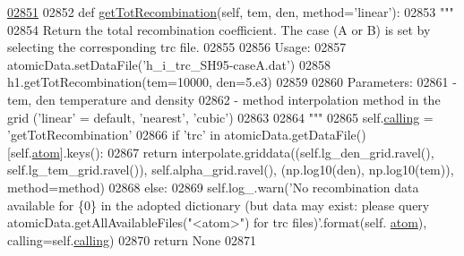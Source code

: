 \begin{DoxyCode}
\hypertarget{classpyneb_1_1core_1_1pynebcore_1_1_rec_atom_l02851}{}\hyperlink{classpyneb_1_1core_1_1pynebcore_1_1_rec_atom_ab7e0b11cdc85dade76528fe5de9886c0}{02851} 
02852     \textcolor{keyword}{def }\hyperlink{classpyneb_1_1core_1_1pynebcore_1_1_rec_atom_ab7e0b11cdc85dade76528fe5de9886c0}{getTotRecombination}(self, tem, den, method='linear'):
02853         \textcolor{stringliteral}{"""}
02854 \textcolor{stringliteral}{        Return the total recombination coefficient. The case (A or B) is set by selecting the corresponding
       trc file.}
02855 \textcolor{stringliteral}{        }
02856 \textcolor{stringliteral}{        Usage:}
02857 \textcolor{stringliteral}{            atomicData.setDataFile('h\_i\_trc\_SH95-caseA.dat')}
02858 \textcolor{stringliteral}{            h1.getTotRecombination(tem=10000, den=5.e3)}
02859 \textcolor{stringliteral}{            }
02860 \textcolor{stringliteral}{        Parameters:}
02861 \textcolor{stringliteral}{            - tem, den  temperature and density}
02862 \textcolor{stringliteral}{            - method    interpolation method in the grid ('linear' = default, 'nearest', 'cubic')    }
02863 \textcolor{stringliteral}{                }
02864 \textcolor{stringliteral}{        """} 
02865         self.\hyperlink{classpyneb_1_1core_1_1pynebcore_1_1_rec_atom_a82ec425ebba32b73a5d9ae52717d47c4}{calling} = \textcolor{stringliteral}{'getTotRecombination'}
02866         \textcolor{keywordflow}{if} \textcolor{stringliteral}{'trc'} \textcolor{keywordflow}{in} atomicData.getDataFile()[self.\hyperlink{classpyneb_1_1core_1_1pynebcore_1_1_rec_atom_a1a2aa175da6b5b8847f409e37437e3d3}{atom}].keys():
02867             \textcolor{keywordflow}{return} interpolate.griddata((self.lg\_den\_grid.ravel(), self.lg\_tem\_grid.ravel()), 
      self.alpha\_grid.ravel(), (np.log10(den), np.log10(tem)), method=method)
02868         \textcolor{keywordflow}{else}:
02869             self.log\_.warn(\textcolor{stringliteral}{'No recombination data available for \{0\} in the adopted dictionary (but data may
       exist: please query atomicData.getAllAvailableFiles("<atom>") for trc files)'}.format(self.
      \hyperlink{classpyneb_1_1core_1_1pynebcore_1_1_rec_atom_a1a2aa175da6b5b8847f409e37437e3d3}{atom}), calling=self.\hyperlink{classpyneb_1_1core_1_1pynebcore_1_1_rec_atom_a82ec425ebba32b73a5d9ae52717d47c4}{calling})
02870             \textcolor{keywordflow}{return} \textcolor{keywordtype}{None}
02871         
        
\end{DoxyCode}
